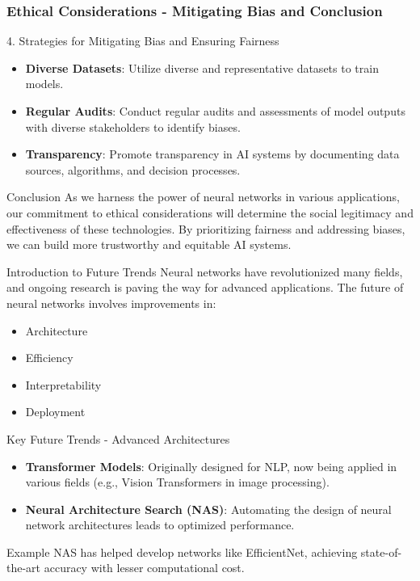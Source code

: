 \documentclass[aspectratio=169]{beamer}
\begin{document}
\begin{frame}[fragile]
    \frametitle{Ethical Considerations - Mitigating Bias and Conclusion}
    \begin{block}{4. Strategies for Mitigating Bias and Ensuring Fairness}
        \begin{itemize}
            \item \textbf{Diverse Datasets}: Utilize diverse and representative datasets to train models.
            \item \textbf{Regular Audits}: Conduct regular audits and assessments of model outputs with diverse stakeholders to identify biases.
            \item \textbf{Transparency}: Promote transparency in AI systems by documenting data sources, algorithms, and decision processes.
        \end{itemize}
    \end{block}

    \begin{block}{Conclusion}
        As we harness the power of neural networks in various applications, our commitment to ethical considerations will determine the social legitimacy and effectiveness of these technologies. By prioritizing fairness and addressing biases, we can build more trustworthy and equitable AI systems.
    \end{block}
\end{frame}

\begin{frame}{Introduction to Future Trends}
    Neural networks have revolutionized many fields, and ongoing research is paving the way for advanced applications. The future of neural networks involves improvements in:
    \begin{itemize}
        \item Architecture
        \item Efficiency
        \item Interpretability
        \item Deployment
    \end{itemize}
\end{frame}

\begin{frame}{Key Future Trends - Advanced Architectures}
    \begin{itemize}
        \item \textbf{Transformer Models}: Originally designed for NLP, now being applied in various fields (e.g., Vision Transformers in image processing).
        \item \textbf{Neural Architecture Search (NAS)}: Automating the design of neural network architectures leads to optimized performance.
    \end{itemize}
    \begin{block}{Example} 
        NAS has helped develop networks like EfficientNet, achieving state-of-the-art accuracy with lesser computational cost.
    \end{block}
\end{frame}
\end{document}
